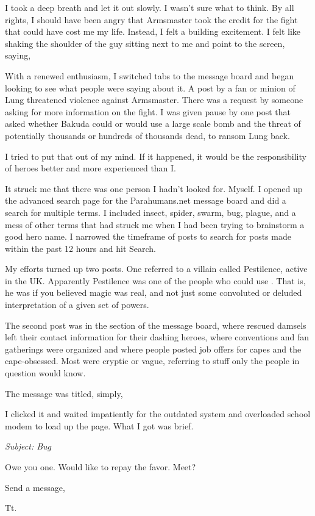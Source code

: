 I took a deep breath and let it out slowly. I wasn't sure what to think. By all rights, I should have been angry that Armsmaster took the credit for the fight that could have cost me my life. Instead, I felt a building excitement. I felt like shaking the shoulder of the guy sitting next to me and point to the screen, saying, 

With a renewed enthusiasm, I switched tabs to the message board and began looking to see what people were saying about it. A post by a fan or minion of Lung threatened violence against Armsmaster. There was a request by someone asking for more information on the fight. I was given pause by one post that asked whether Bakuda could or would use a large scale bomb and the threat of potentially thousands or hundreds of thousands dead, to ransom Lung back.

I tried to put that out of my mind. If it happened, it would be the responsibility of heroes better and more experienced than I.

It struck me that there was one person I hadn't looked for. Myself. I opened up the advanced search page for the Parahumans.net message board and did a search for multiple terms. I included insect, spider, swarm, bug, plague, and a mess of other terms that had struck me when I had been trying to brainstorm a good hero name. I narrowed the timeframe of posts to search for posts made within the past 12 hours and hit Search.

My efforts turned up two posts. One referred to a villain called Pestilence, active in the UK. Apparently Pestilence was one of the people who could use . That is, he was if you believed magic was real, and not just some convoluted or deluded interpretation of a given set of powers.

The second post was in the  section of the message board, where rescued damsels left their contact information for their dashing heroes, where conventions and fan gatherings were organized and where people posted job offers for capes and the cape-obsessed. Most were cryptic or vague, referring to stuff only the people in question would know.

The message was titled, simply, 

I clicked it and waited impatiently for the outdated system and overloaded school modem to load up the page. What I got was brief.

{\it Subject: Bug

Owe you one. Would like to repay the favor. Meet?

Send a message,

Tt.}

